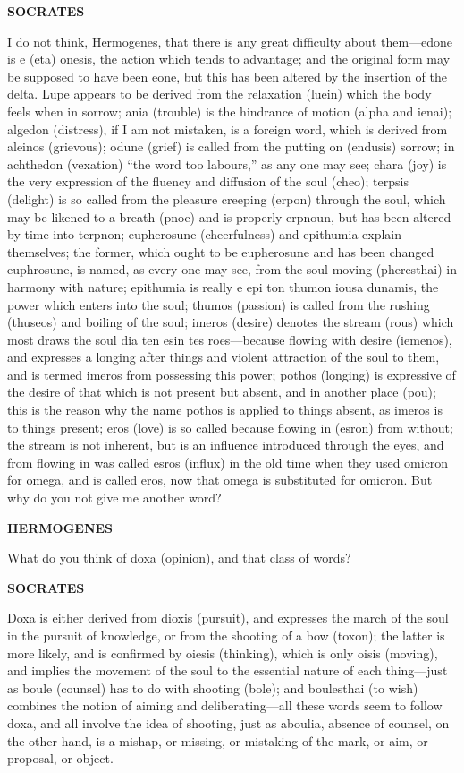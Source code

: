 \documentclass[11pt,letter]{article}
\begin{document}
\par \textbf{SOCRATES}
\par   I do not think, Hermogenes, that there is any great difficulty about them—edone is e (eta) onesis, the action which tends to advantage; and the original form may be supposed to have been eone, but this has been altered by the insertion of the delta. Lupe appears to be derived from the relaxation (luein) which the body feels when in sorrow; ania (trouble) is the hindrance of motion (alpha and ienai); algedon (distress), if I am not mistaken, is a foreign word, which is derived from aleinos (grievous); odune (grief) is called from the putting on (endusis) sorrow; in achthedon (vexation) “the word too labours,” as any one may see; chara (joy) is the very expression of the fluency and diffusion of the soul (cheo); terpsis (delight) is so called from the pleasure creeping (erpon) through the soul, which may be likened to a breath (pnoe) and is properly erpnoun, but has been altered by time into terpnon; eupherosune (cheerfulness) and epithumia explain themselves; the former, which ought to be eupherosune and has been changed euphrosune, is named, as every one may see, from the soul moving (pheresthai) in harmony with nature; epithumia is really e epi ton thumon iousa dunamis, the power which enters into the soul; thumos (passion) is called from the rushing (thuseos) and boiling of the soul; imeros (desire) denotes the stream (rous) which most draws the soul dia ten esin tes roes—because flowing with desire (iemenos), and expresses a longing after things and violent attraction of the soul to them, and is termed imeros from possessing this power; pothos (longing) is expressive of the desire of that which is not present but absent, and in another place (pou); this is the reason why the name pothos is applied to things absent, as imeros is to things present; eros (love) is so called because flowing in (esron) from without; the stream is not inherent, but is an influence introduced through the eyes, and from flowing in was called esros (influx) in the old time when they used omicron for omega, and is called eros, now that omega is substituted for omicron. But why do you not give me another word?

\par \textbf{HERMOGENES}
\par   What do you think of doxa (opinion), and that class of words?

\par \textbf{SOCRATES}
\par   Doxa is either derived from dioxis (pursuit), and expresses the march of the soul in the pursuit of knowledge, or from the shooting of a bow (toxon); the latter is more likely, and is confirmed by oiesis (thinking), which is only oisis (moving), and implies the movement of the soul to the essential nature of each thing—just as boule (counsel) has to do with shooting (bole); and boulesthai (to wish) combines the notion of aiming and deliberating—all these words seem to follow doxa, and all involve the idea of shooting, just as aboulia, absence of counsel, on the other hand, is a mishap, or missing, or mistaking of the mark, or aim, or proposal, or object.
\end{document}
